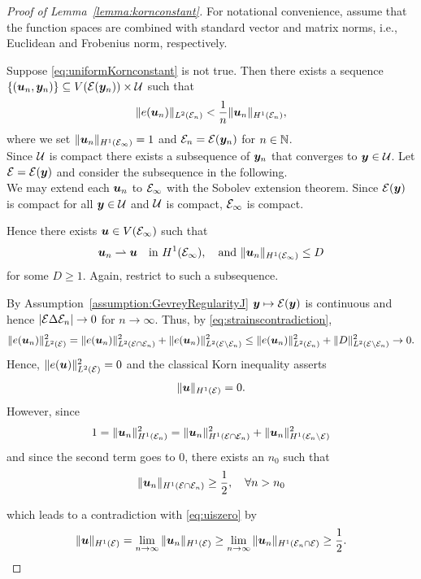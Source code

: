 \begin{proof}[Proof of Lemma~\ref{lemma:kornconstant}]\label{proof:KornConstant} For notational convenience, assume that the function spaces are combined with standard vector and matrix norms, i.e., Euclidean and Frobenius norm, respectively.

Suppose \eqref{eq:uniformKornconstant} is not true.
    Then there exists a sequence $ \{ ({\boldsymbol{u}}_n,{\boldsymbol{y}}_n) \} \subseteq V(\mathcal{E}({\boldsymbol{y}}_n)) \times \mathcal{U}$
    such that
    \begin{align}\label{eq:strainscontradiction}
        \| e({\boldsymbol{u}}_n) \|_{L^2(\mathcal{E}_n)} < \frac 1 n \| {\boldsymbol{u}}_n \|_{H^1(\mathcal{E}_n)},
    \end{align}
    where we set $\| {\boldsymbol{u}}_n \|_{H^1(\mathcal{E}_\infty)} = 1$ and $\mathcal{E}_n = \mathcal{E}({\boldsymbol{y}}_n)$ for $n \in \mathbb{N}$. \\
    Since $\mathcal{U} $ is compact there exists a subsequence of ${\boldsymbol{y}}_n$ that converges to ${\boldsymbol{y}} \in \mathcal{U}$.
    Let $\mathcal{E} = \mathcal{E}({\boldsymbol{y}})$ and consider the subsequence in the following.\\
We may extend each ${\boldsymbol{u}}_n$  to $\mathcal{E}_\infty$ with the Sobolev extension theorem.
Since $\mathcal{E}({\boldsymbol{y}})$ is compact for all ${\boldsymbol{y}} \in \mathcal{U}$ and $\mathcal{U}$ is compact, $\mathcal{E}_\infty$ is compact.

Hence there exists ${\boldsymbol{u}} \in V(\mathcal{E}_\infty)$ such that
\begin{align*}
{\boldsymbol{u}}_n \rightharpoonup {\boldsymbol{u}} \quad \text{in } H^1(\mathcal{E}_\infty), \quad \text{and } \| {\boldsymbol{u}}_n\|_{H^1(\mathcal{E}_\infty)} \leq D
\end{align*}
for some $D\geq 1$. Again, restrict to such a subsequence.

By Assumption~\ref{assumption:GevreyRegularityJ} ${\boldsymbol{y}} \mapsto \mathcal{E}({\boldsymbol{y}})$ is continuous and hence $\vert \mathcal{E} \Delta \mathcal{E}_n \vert  \to 0 $ for $n \to \infty$. Thus, by \eqref{eq:strainscontradiction},
\begin{align*}
\| e({\boldsymbol{u}}_n) \|^2_{L^2(\mathcal{E})} =  \| e({\boldsymbol{u}}_n) \|^2_{L^2(\mathcal{E} \cap \mathcal{E}_n)}  + \| e({\boldsymbol{u}}_n) \|^2_{L^2(\mathcal{E} \setminus \mathcal{E}_n)}   \leq  \| e({\boldsymbol{u}}_n) \|^2_{L^2(\mathcal{E}_n)} + \| D\|^2_{L^2(\mathcal{E} \setminus \mathcal{E}_n)}  \to  0.
\end{align*}
Hence, $ \| e({\boldsymbol{u}}) \|^2_{L^2(\mathcal{E})} = 0 $ and the classical Korn inequality \cite[Theorem 1.6-1]{ciarletIntroductionToShellTheory} asserts
\begin{align}\label{eq:uiszero}
\| {\boldsymbol{u}} \|_{H^1(\mathcal{E}) } = 0.
\end{align}
However, since
\begin{align*}
 1 = \| {\boldsymbol{u}}_n\|^2_{H^1( \mathcal{E}_n)} = \| {\boldsymbol{u}}_n \|^2_{H^1(\mathcal{E} \cap \mathcal{E}_n)} + \| {\boldsymbol{u}}_n \|^2_{H^1(\mathcal{E}_n \setminus \mathcal{E} )}
\end{align*}
and since the second term goes to $0$, there exists an $n_0 $ such that
\begin{align*}
 \| {\boldsymbol{u}}_n\|_{H^1(\mathcal{E} \cap \mathcal{E}_n)}   \geq \frac 1 2, \quad \forall n > n_0
\end{align*}

which leads to a contradiction with \eqref{eq:uiszero} by
\begin{align*}
\|{\boldsymbol{u}} \|_{H^1(\mathcal{E})} = \lim_{n \to \infty } \|{\boldsymbol{u}}_n \|_{H^1(\mathcal{E})} \geq \lim_{n \to \infty } \|{\boldsymbol{u}}_n \|_{H^1(\mathcal{E}_n \cap \mathcal{E})} \geq \frac 1 2.
\end{align*}
\end{proof}

%